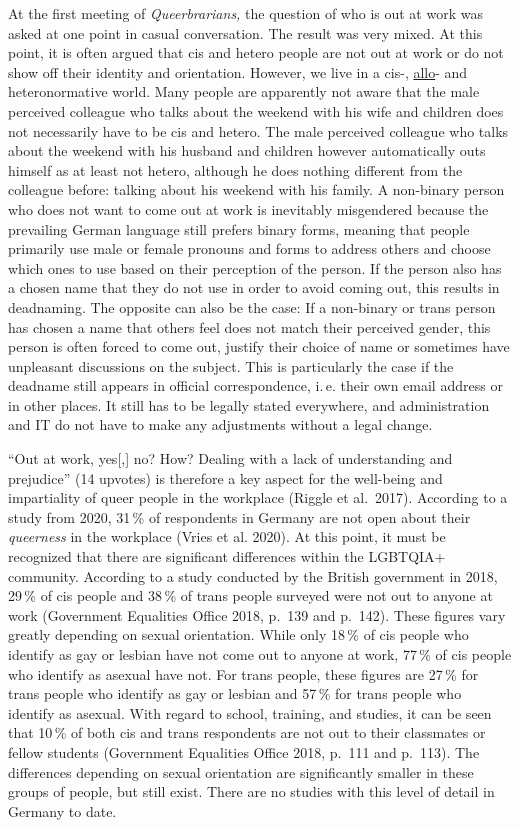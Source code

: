 \documentclass[a4paper,
fontsize=11pt,
oneside,
numbers=noperiodatend,
parskip=half-,
bibliography=totoc,
final
]{scrartcl}
\begin{document}
At the first meeting of \emph{Queerbrarians,} the question of who is out
at work was asked at one point in casual conversation. The result was
very mixed. At this point, it is often argued that cis and hetero people
are not out at work or do not show off their identity and orientation.
However, we live in a cis-, \href{https://lgbtqia.fandom.com/wiki/Allo}{allo}- and heteronormative world. Many people are
apparently not aware that the male perceived colleague who talks about
the weekend with his wife and children does not necessarily have to be
cis and hetero. The male perceived colleague who talks about the weekend
with his husband and children however automatically outs himself as at
least not hetero, although he does nothing different from the colleague
before: talking about his weekend with his family. A non-binary person
who does not want to come out at work is inevitably misgendered because
the prevailing German language still prefers binary forms, meaning that
people primarily use male or female pronouns and forms to address others
and choose which ones to use based on their perception of the person. If
the person also has a chosen name that they do not use in order to avoid
coming out, this results in deadnaming. The opposite can also be the
case: If a non-binary or trans person has chosen a name that others feel
does not match their perceived gender, this person is often forced to
come out, justify their choice of name or sometimes have unpleasant
discussions on the subject. This is particularly the case if the
deadname still appears in official correspondence, i.\,e. their own email
address or in other places. It still has to be legally stated
everywhere, and administration and IT do not have to make any
adjustments without a legal change.

\enquote{Out at work, yes{[},{]} no? How? Dealing with a lack of understanding
and prejudice} (14 upvotes) is therefore a key aspect for the well-being
and impartiality of queer people in the workplace (Riggle et al.~2017).
According to a study from 2020, 31\,\% of respondents in Germany are not
open about their \emph{queerness} in the workplace (Vries et al. 2020).
At this point, it must be recognized that there are significant
differences within the LGBTQIA+ community. According to a study
conducted by the British government in 2018, 29\,\% of cis people and 38\,\%
of trans people surveyed were not out to anyone at work (Government
Equalities Office 2018, p.~139 and p.~142). These figures vary greatly
depending on sexual orientation. While only 18\,\% of cis people who
identify as gay or lesbian have not come out to anyone at work, 77\,\% of
cis people who identify as asexual have not. For trans people, these
figures are 27\,\% for trans people who identify as gay or lesbian and
57\,\% for trans people who identify as asexual. With regard to school,
training, and studies, it can be seen that 10\,\% of both cis and trans
respondents are not out to their classmates or fellow students
(Government Equalities Office 2018, p.~111 and p.~113). The differences
depending on sexual orientation are significantly smaller in these
groups of people, but still exist. There are no studies with this level
of detail in Germany to date.
\end{document}

